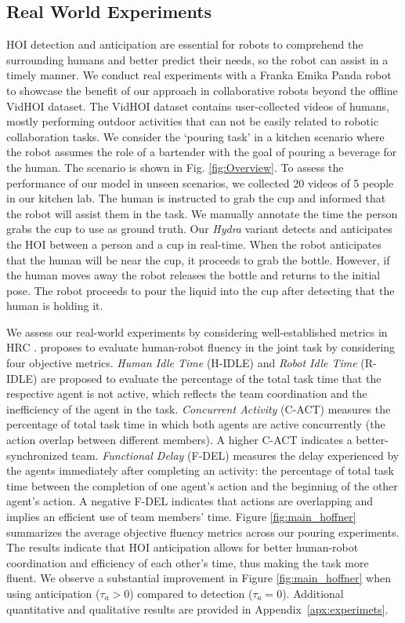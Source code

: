 \documentclass{article}
\begin{document}
\subsection{Real World Experiments}

HOI detection and anticipation are essential for robots to comprehend the surrounding humans and better predict their needs, so the robot can assist in a timely manner.  We conduct real experiments with a Franka Emika Panda robot to showcase the benefit of our approach in collaborative robots beyond the offline VidHOI dataset.  The VidHOI dataset contains user-collected videos of humans, mostly performing outdoor activities that can not be easily related to robotic collaboration tasks. We consider the `pouring task' in a kitchen scenario where the robot assumes the role of a bartender with the goal of pouring a beverage for the human. The scenario is shown in Fig. \ref{fig:Overview}. To assess the performance of our model in unseen scenarios, we collected 20 videos of 5 people in our kitchen lab. The human is instructed to grab the cup and informed that the robot will assist them in the task. We manually annotate the time the person grabs the cup to use as ground truth. Our \textit{Hydra} variant detects and anticipates the HOI between a person and a cup in real-time. When the robot anticipates that the human will be near the cup, it proceeds to grab the bottle. However, if the human moves away the robot releases the bottle and returns to the initial pose. The robot proceeds to pour the liquid into the cup after detecting that the human is holding it. 

We assess our real-world experiments by considering well-established metrics in HRC \citep{GARCIA2020315}. \citep{GARCIA2020315} proposes to evaluate human-robot fluency in the joint task by considering four objective metrics. \textit{Human Idle Time} (H-IDLE) and \textit{Robot Idle Time} (R-IDLE) are proposed to evaluate the percentage of the total task time that the respective agent is not active, which reflects the team coordination and the inefficiency of the agent in the task.  \textit{Concurrent Activity} (C-ACT) measures the percentage of total task time in which both agents are active concurrently (the action overlap between different members). A higher  C-ACT indicates a better-synchronized team. \textit{Functional Delay} (F-DEL) measures the delay experienced by the agents immediately after completing an activity: the percentage of total task time between the completion of one agent's action and the beginning of the other agent's action. A negative F-DEL indicates that actions are overlapping and implies an efficient use of team members' time. Figure \ref{fig:main_hoffner} summarizes the average objective fluency metrics across our pouring experiments. The results indicate that HOI anticipation allows for better human-robot coordination and efficiency of each other's time, thus making the task more fluent. We observe a substantial improvement in Figure \ref{fig:main_hoffner} when using anticipation ($\tau_a > 0$) compared to detection ($\tau_a = 0$). Additional quantitative and qualitative results are provided in Appendix~\ref{apx:experimets}.
\end{document}
